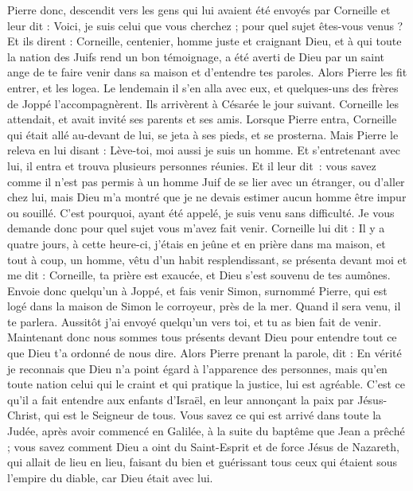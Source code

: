 \begin{multicols}{2}
Pierre donc, descendit vers les gens qui lui avaient été envoyés par Corneille et leur dit : Voici, je suis celui que vous cherchez ; pour quel sujet êtes-vous venus ?
Et ils dirent : Corneille, centenier, homme juste et craignant Dieu, et à qui toute la nation des Juifs rend un bon témoignage, a été averti de Dieu par un saint ange de te faire venir dans sa maison et d’entendre tes paroles.
Alors Pierre les fit entrer, et les logea. Le lendemain il s'en alla avec eux, et quelques-uns des frères de Joppé l’accompagnèrent.
Ils arrivèrent à Césarée le jour suivant. Corneille les attendait, et avait invité ses parents et ses amis.
Lorsque Pierre entra, Corneille qui était allé au-devant de lui, se jeta à ses pieds, et se prosterna.
Mais Pierre le releva en lui disant : Lève-toi, moi aussi je suis un homme.
Et s’entretenant avec lui, il entra et trouva plusieurs personnes réunies.
Et il leur dit : vous savez comme il n’est pas permis à un homme Juif de se lier avec un étranger, ou d’aller chez lui, mais Dieu m’a montré que je ne devais estimer aucun homme être impur ou souillé.
C'est pourquoi, ayant été appelé, je suis venu sans difficulté. Je vous demande donc pour quel sujet vous m'avez fait venir.
Corneille lui dit : Il y a quatre jours, à cette heure-ci, j'étais en jeûne et en prière dans ma maison, et tout à coup, un homme, vêtu d’un habit resplendissant, se présenta devant moi et me dit :
Corneille, ta prière est exaucée, et Dieu s'est souvenu de tes aumônes.
Envoie donc quelqu’un à Joppé, et fais venir Simon, surnommé Pierre, qui est logé dans la maison de Simon le corroyeur, près de la mer. Quand il sera venu, il te parlera.
Aussitôt j’ai envoyé quelqu’un vers toi, et tu as bien fait de venir. Maintenant donc nous sommes tous présents devant Dieu pour entendre tout ce que Dieu t'a ordonné de nous dire.
Alors Pierre prenant la parole, dit : En vérité je reconnais que Dieu n'a point égard à l'apparence des personnes,
mais qu'en toute nation celui qui le craint et qui pratique la justice, lui est agréable.
C'est ce qu'il a fait entendre aux enfants d'Israël, en leur annonçant la paix par Jésus-Christ, qui est le Seigneur de tous.
Vous savez ce qui est arrivé dans toute la Judée, après avoir commencé en Galilée, à la suite du baptême que Jean a prêché ;
vous savez comment Dieu a oint du Saint-Esprit et de force Jésus de Nazareth, qui allait de lieu en lieu, faisant du bien et guérissant tous ceux qui étaient sous l’empire du diable, car Dieu était avec lui.

\end{multicols}
